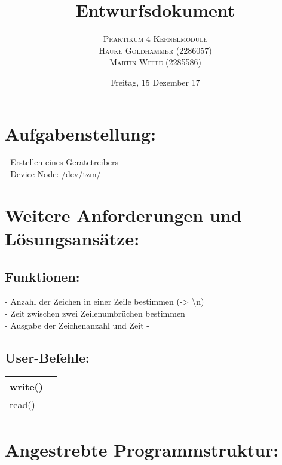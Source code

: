 \documentclass[paper=a4, fontsize=12pt]{article}
\title{\vspace{-15mm}\fontsize{24pt}{10pt}\selectfont\textbf{Entwurfsdokument}} %
\author{
    \large
    {\textsc{Praktikum 4 Kernelmodule}}\\[2mm]
    {\textsc{Hauke Goldhammer (2286057)}}\\[2mm]
    {\textsc{Martin Witte (2285586)}}\\[2mm]
}
\date{Freitag, 15 Dezember 17} %
\begin{document}
\maketitle %
\thispagestyle{fancy} %

\section{Aufgabenstellung:}
- Erstellen eines Gerätetreibers\\
- Device-Node: /dev/tzm/\\


\section{Weitere Anforderungen und Lösungsansätze:}

\subsection{Funktionen:}
- Anzahl der Zeichen in einer Zeile bestimmen (-> \textbackslash n)\\
- Zeit zwischen zwei Zeilenumbrüchen bestimmen\\
- Ausgabe der Zeichenanzahl und Zeit
- 

\subsection{User-Befehle:}
\begin{tabular}{| l | l |}
\hline
write() & \\
\hline
read() & \\
\hline
\end{tabular}




\section{Angestrebte Programmstruktur:}
\end{document}
